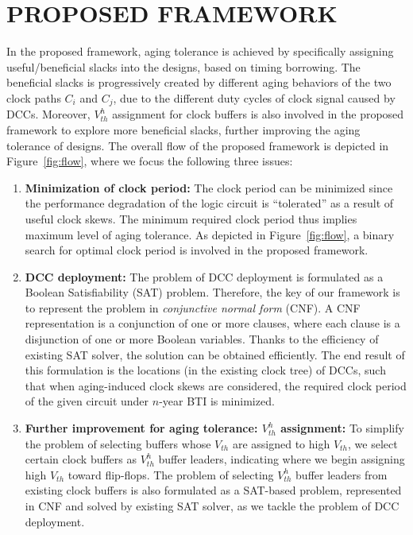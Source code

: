 \section{PROPOSED FRAMEWORK}
\label{sec:framework}
In the proposed framework, aging tolerance is achieved by specifically assigning useful/beneficial slacks into the designs, based on timing borrowing. The beneficial slacks is progressively created by different aging behaviors of the two clock paths $C_{i}$ and $C_{j}$, due to the different duty cycles of clock signal caused by DCCs. Moreover, $V_{th}^h$ assignment for clock buffers is also involved in the proposed framework to explore more beneficial slacks, further improving the aging tolerance of designs.
The overall flow of the proposed framework is depicted in Figure~\ref{fig:flow}, where we focus the following three issues:
\begin{enumerate}[leftmargin=*]
	\item \textbf{Minimization of clock period:} The clock period can be minimized since the performance degradation of the logic circuit is \enquote{tolerated} as a result of useful clock skews. The minimum required clock period thus implies maximum level of aging tolerance. As depicted in Figure~\ref{fig:flow}, a binary search for optimal clock period is involved in the proposed framework.
	\item \textbf{DCC deployment:} The problem of  DCC deployment is formulated as a Boolean Satisfiability (SAT) problem. Therefore, the key of our framework is to represent the problem in \textit{conjunctive normal form} (CNF). A CNF representation is a conjunction of one or more clauses, where each clause is a disjunction of one or more Boolean variables. Thanks to the efficiency of existing SAT solver, the solution can be obtained efficiently. The end result of this formulation is the locations (in the existing clock tree) of DCCs, such that when aging-induced clock skews are considered, the required clock period of the given circuit under $n$-year BTI is minimized. 
	\item \textbf{Further improvement for aging tolerance: $V_{th}^h$ assignment:} To simplify the problem of selecting buffers whose $V_{th}$ are assigned to high $V_{th}$, we select certain clock buffers as $V_{th}^h$ buffer leaders, indicating where we begin assigning high $V_{th}$ toward flip-flops. The problem of selecting $V_{th}^h$ buffer leaders from existing clock buffers is also formulated as a SAT-based problem, represented in CNF and solved by existing SAT solver, as we tackle the problem of DCC deployment.
\end{enumerate}

